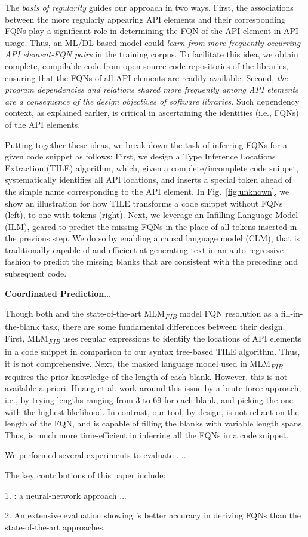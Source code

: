 
The {\em basis of regularity} guides our approach in two ways. First, the associations between the more regularly appearing API elements and their corresponding FQNs play a significant role in determining the FQN of the API element in API usage. Thus, an ML/DL-based model could {\em learn from more frequently occurring API element-FQN pairs} in the training corpus. To facilitate this idea, we obtain complete, compilable code from open-source code repositories of the libraries, ensuring that the FQNs of all API elements are readily available. Second, {\em the program dependencies and relations shared more frequently among API elements are a consequence of the design objectives of software libraries}. Such dependency context, as explained earlier, is critical in ascertaining the identities (i.e., FQNs) of the API elements.


Putting together these ideas, we break down the task of inferring FQNs for a given code snippet as follows: First, we design a Type Inference Locations Extraction (TILE) algorithm, which, given a complete/incomplete code snippet, systematically identifies all API locations, and inserts a special \code{[blank]} token ahead of the simple name corresponding to the API element. In Fig.~\ref{fig:unknown}, we show an illustration for how TILE transforms a code snippet without FQNs (left), to one with \code{[blank]} tokens (right). Next, we leverage an Infilling Language Model~\cite{} (ILM), geared to predict the missing FQNs in the place of all \code{[blank]} tokens inserted in the previous step. We do so by enabling a causal language model (CLM), that is traditionally capable of and efficient at generating text in an auto-regressive fashion to predict the missing blanks that are consistent with the preceding and subsequent code.

{\bf Coordinated Prediction}...

Though both \tool and the state-of-the-art MLM\textsubscript{\textit{FIB}} model FQN resolution as a fill-in-the-blank task, there are some fundamental differences between their design. First, MLM\textsubscript{\textit{FIB}} uses regular expressions to identify the locations of API elements in a code snippet in comparison to our syntax tree-based TILE algorithm. Thus, it is not comprehensive. Next, the masked language model used in MLM\textsubscript{\textit{FIB}} requires the prior knowledge of the length of each blank. However, this is not available a priori. Huang et al. work around this issue by a brute-force approach, i.e., by trying lengths ranging from 3 to 69 for each blank, and picking the one with the highest likelihood. In contrast, our tool, by design, is not reliant on the length of the FQN, and is capable of filling the blanks with variable length spans. Thus, \tool is much more time-efficient in inferring all the FQNs in a code snippet.


We performed several experiments to evaluate {\tool}. ...

The key contributions of this paper include:

1. {\tool}: a neural-network approach ...

2. An extensive evaluation showing {\tool}'s better accuracy in
deriving FQNs than the state-of-the-art approaches.
